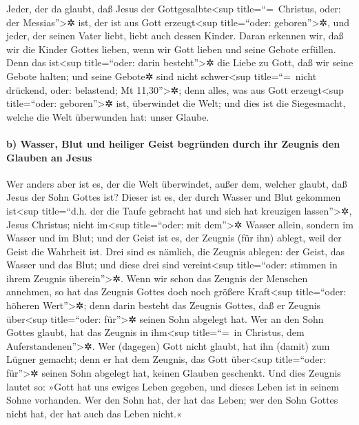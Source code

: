  Jeder, der da glaubt, daß Jesus der
Gottgesalbte\textless sup title=``=~Christus, oder: der
Messias''\textgreater✲ ist, der ist aus Gott erzeugt\textless sup
title=``oder: geboren''\textgreater✲, und jeder, der seinen Vater liebt,
liebt auch dessen Kinder.  Daran erkennen wir, daß wir die
Kinder Gottes lieben, wenn wir Gott lieben und seine Gebote erfüllen.
 Denn das ist\textless sup title=``oder: darin
besteht''\textgreater✲ die Liebe zu Gott, daß wir seine Gebote halten;
und seine Gebote✲ sind nicht schwer\textless sup title=``=~nicht
drückend, oder: belastend; Mt 11,30''\textgreater✲;  denn
alles, was aus Gott erzeugt\textless sup title=``oder:
geboren''\textgreater✲ ist, überwindet die Welt; und dies ist die
Siegesmacht, welche die Welt überwunden hat: unser Glaube.

\hypertarget{b-wasser-blut-und-heiliger-geist-begruxfcnden-durch-ihr-zeugnis-den-glauben-an-jesus}{%
\paragraph{b) Wasser, Blut und heiliger Geist begründen durch ihr
Zeugnis den Glauben an
Jesus}\label{b-wasser-blut-und-heiliger-geist-begruxfcnden-durch-ihr-zeugnis-den-glauben-an-jesus}}

 Wer anders aber ist es, der die Welt überwindet, außer
dem, welcher glaubt, daß Jesus der Sohn Gottes ist? 
Dieser ist es, der durch Wasser und Blut gekommen ist\textless sup
title=``d.h. der die Taufe gebracht hat und sich hat kreuzigen
lassen''\textgreater✲, Jesus Christus; nicht im\textless sup
title=``oder: mit dem''\textgreater✲ Wasser allein, sondern im Wasser
und im Blut; und der Geist ist es, der Zeugnis (für ihn) ablegt, weil
der Geist die Wahrheit ist.  Drei sind es nämlich, die
Zeugnis ablegen:  der Geist, das Wasser und das Blut; und
diese drei sind vereint\textless sup title=``oder: stimmen in ihrem
Zeugnis überein''\textgreater✲.  Wenn wir schon das
Zeugnis der Menschen annehmen, so hat das Zeugnis Gottes doch noch
größere Kraft\textless sup title=``oder: höheren Wert''\textgreater✲;
denn darin besteht das Zeugnis Gottes, daß er Zeugnis über\textless sup
title=``oder: für''\textgreater✲ seinen Sohn abgelegt hat.
 Wer an den Sohn Gottes glaubt, hat das Zeugnis in
ihm\textless sup title=``=~in Christus, dem
Auferstandenen''\textgreater✲. Wer (dagegen) Gott nicht glaubt, hat ihn
(damit) zum Lügner gemacht; denn er hat dem Zeugnis, das Gott
über\textless sup title=``oder: für''\textgreater✲ seinen Sohn abgelegt
hat, keinen Glauben geschenkt.  Und dies Zeugnis lautet
so: »Gott hat uns ewiges Leben gegeben, und dieses Leben ist in seinem
Sohne vorhanden.  Wer den Sohn hat, der hat das Leben;
wer den Sohn Gottes nicht hat, der hat auch das Leben nicht.«

